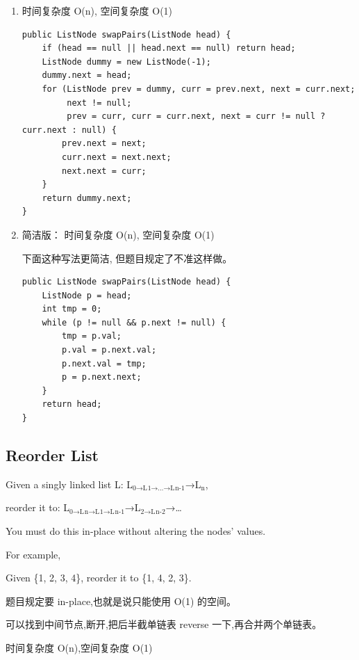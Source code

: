 \documentclass[12pt]{book}
\begin{document}
\begin{enumerate}
\item 时间复杂度 O(n), 空间复杂度 O(1)
\label{sec-3-2-7-1}

\lstset{language=java,label= ,caption= ,numbers=none}
\begin{lstlisting}
public ListNode swapPairs(ListNode head) {
    if (head == null || head.next == null) return head;
    ListNode dummy = new ListNode(-1);
    dummy.next = head;
    for (ListNode prev = dummy, curr = prev.next, next = curr.next;
         next != null;
         prev = curr, curr = curr.next, next = curr != null ? curr.next : null) {
        prev.next = next;
        curr.next = next.next;
        next.next = curr;
    }
    return dummy.next;
}
\end{lstlisting}

\item 简洁版： 时间复杂度 O(n), 空间复杂度 O(1)
\label{sec-3-2-7-2}


下面这种写法更简洁, 但题目规定了不准这样做。

\lstset{language=java,label= ,caption= ,numbers=none}
\begin{lstlisting}
public ListNode swapPairs(ListNode head) {
    ListNode p = head;
    int tmp = 0;
    while (p != null && p.next != null) {
        tmp = p.val;
        p.val = p.next.val;
        p.next.val = tmp;
        p = p.next.next;
    }
    return head;
}
\end{lstlisting}
\end{enumerate}

\subsection{Reorder List}
\label{sec-3-2-8}

Given a singly linked list L: L$_{\text{0→L}}$$_{\text{1→…→L}}$$_{\text{n-1}}$→L$_{\text{n}}$,

reorder it to: L$_{\text{0→L}}$$_{\text{n→L}}$$_{\text{1→L}}$$_{\text{n-1}}$→L$_{\text{2→L}}$$_{\text{n-2}}$→…

You must do this in-place without altering the nodes' values.

For example,

Given \{1, 2, 3, 4\},  reorder it to \{1, 4, 2, 3\}.

题目规定要 in-place,也就是说只能使用 O(1) 的空间。

可以找到中间节点,断开,把后半截单链表 reverse 一下,再合并两个单链表。

时间复杂度 O(n),空间复杂度 O(1)
\end{document}

